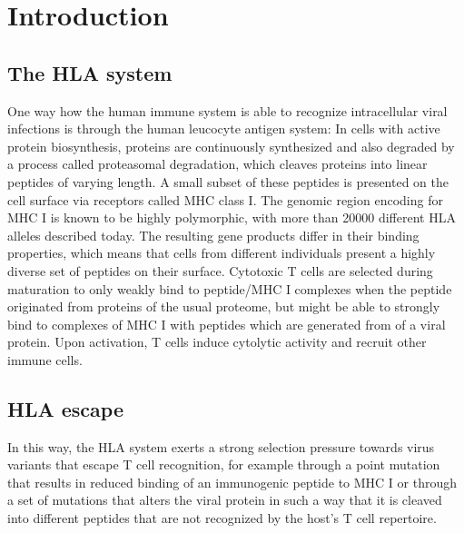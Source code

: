 \documentclass[fleqn,11pt]{SelfArx} %
\affiliation{\textsuperscript{1}\textit{Bioinformatics \& Computational Biophysics, Faculty of Biology, University of Duisburg-Essen, 45117 Essen, Germany}} %
\begin{document}
\flushbottom %

\maketitle %

{
  \hypersetup{linkcolor=black}
  \tableofcontents
}

\pagebreak

\section{Introduction}

\subsection{The HLA system}

One way how the human immune system is able to recognize intracellular viral infections
is through the human leucocyte antigen system:
In cells with active protein biosynthesis, proteins are continuously synthesized
and also degraded by a process called proteasomal degradation, which cleaves
proteins into linear peptides of varying length.
A small subset of these peptides is presented on the cell surface via
receptors called MHC class I. The genomic region encoding for MHC I is known to be
highly polymorphic, with more than 20000 different HLA alleles described today.
The resulting gene products differ in their binding properties, which means that
cells from different individuals present a highly diverse set of peptides on their
surface.
Cytotoxic T cells are selected during maturation to only weakly bind to 
peptide/MHC I complexes when the peptide originated from proteins of the usual proteome, 
but might be able to strongly bind to complexes of MHC I with peptides which are 
generated from of a viral protein.
Upon activation, T cells induce cytolytic activity and recruit other immune cells.

\subsection{HLA escape}
In this way, the HLA system exerts a strong selection pressure towards virus variants
that escape T cell recognition, for example through a point mutation
that results in reduced binding of an immunogenic peptide to MHC I or through a
set of mutations that alters the viral protein in such a way that it is cleaved into 
different peptides that are not recognized by the host's T cell repertoire.
\end{document}
